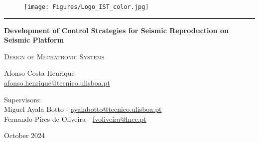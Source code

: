 \documentclass[9pt]{extarticle}
\begin{document}
\begin{titlepage} %

\centering


\begin{figure}
 \centering
 \texttt{[image: Figures/Logo\_IST\_color.jpg]}
\end{figure}


{ \rule{\linewidth}{0.5mm} }

{\Huge\bfseries Development of Control Strategies for Seismic Reproduction on Seismic Platform \par}
\vspace{0.2cm}
{\huge\bfseries \par}
\vspace{0.5cm}
{\scshape\huge Design of Mechatronic Systems\par} %

\vspace{1cm}

\begin{figure}[H]
 \centering
\end{figure}

\vspace{1cm} 

\vspace{.2cm}

\huge Afonso Costa Henrique \\
\href{mailto:afonso.henrique@tecnico.ulisboa.pt}{\Large afonso.henrique@tecnico.ulisboa.pt}\par
\vspace{10mm}


Supervisors: \\
\vspace{2mm}
\Large
{Miguel Ayala Botto  - \href{mailto:ayalabotto@tecnico.ulisboa.pt}{ayalabotto@tecnico.ulisboa.pt}}\\
\vspace{1mm}
{Fernando Pires de Oliveira  - \href{mailto:fvoliveira@lnec.pt}{fvoliveira@lnec.pt}}     \\


\vspace{.7cm}

\vfill {\large October 2024\par} %

\end{titlepage}
\setcounter{page}{2}
\clearpage
 
\end{document}

